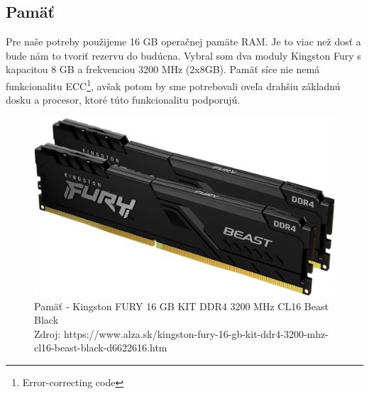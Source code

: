 \documentclass[12pt,oneside,slovak,a4paper]{article}
\begin{document}
\subsection{Pamäť}
Pre naše potreby použijeme 16 GB operačnej pamäte RAM. Je to viac než dosť a bude nám to tvoriť rezervu do budúcna. Vybral som dva moduly Kingston Fury s kapacitou 8 GB a frekvenciou 3200 MHz (2x8GB). Pamäť síce nie nemá funkcionalitu ECC\footnote{Error-correcting code}, avšak potom by sme potrebovali oveľa drahšiu základnú dosku a procesor, ktoré túto funkcionalitu podporujú.

\begin{figure}[H]
	\centering
	\captionsetup{justification=centering,margin=2cm}
	\includegraphics[scale=0.15]{./images/ram.png} %
	\centering
	\caption{Pamäť - Kingston FURY 16 GB KIT DDR4 3200 MHz CL16 Beast Black \\ Zdroj: https://www.alza.sk/kingston-fury-16-gb-kit-ddr4-3200-mhz-cl16-beast-black-d6622616.htm}
\end{figure}
\end{document}
